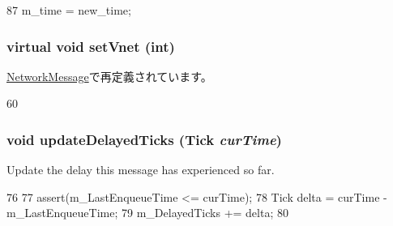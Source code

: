 \begin{DoxyCode}
87 { m_time = new_time; }
\end{DoxyCode}
\hypertarget{classMessage_a95f04a7c3408d2acb1390edf886071c9}{
\subsubsection[{setVnet}]{\setlength{\rightskip}{0pt plus 5cm}virtual void setVnet (int)}}
\label{classMessage_a95f04a7c3408d2acb1390edf886071c9}


\hyperlink{classNetworkMessage_a528d693acf172c3acd1f7fbf73a463f9}{NetworkMessage}で再定義されています。


\begin{DoxyCode}
60 {}
\end{DoxyCode}
\hypertarget{classMessage_a505c1e462c299eb1ad016d74957777a2}{
\subsubsection[{updateDelayedTicks}]{\setlength{\rightskip}{0pt plus 5cm}void updateDelayedTicks ({\bf Tick} {\em curTime})}}
\label{classMessage_a505c1e462c299eb1ad016d74957777a2}


Update the delay this message has experienced so far. 


\begin{DoxyCode}
76     {
77         assert(m_LastEnqueueTime <= curTime);
78         Tick delta = curTime - m_LastEnqueueTime;
79         m_DelayedTicks += delta;
80     }
\end{DoxyCode}


